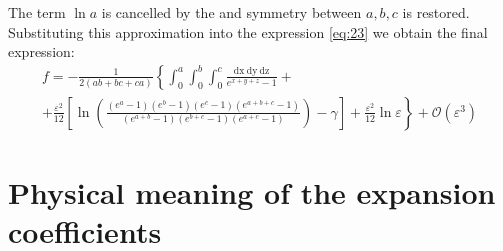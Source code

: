 \documentclass{article}
\newcommand{\dx}{\mathrm{dx}~}
\newcommand{\dy}{\mathrm{dy}~}
\newcommand{\dz}{\mathrm{dz}}
\begin{document}
  

The term $\ln a$ is cancelled by the  and symmetry between $a,b,c$ is restored.
Substituting this approximation into the expression \eqref{eq:23} we obtain 
 the final expression:
\begin{multline}
  \label{eq:3}
 f=-\frac{1}{2(ab+bc+ca)}\left\{\int_{0}^{a} \int_{0}^{b}\int_{0}^{c}\frac{\dx \dy \dz}{e^{x+y+z}-1}+\right.\\
  \left.+\frac{\varepsilon^{2}}{12}\left[\ln\left(\frac{(e^{a}-1)(e^{b}-1)(e^{c}-1)(e^{a+b+c}-1)}{(e^{a+b}-1)(e^{b+c}-1)(e^{a+c}-1)}\right)-
      \gamma\right]+\frac{\varepsilon^{2}}{12}\ln \varepsilon\right\} +\mathcal{O}(\varepsilon^{3})
\end{multline}

\section{Physical meaning of the expansion coefficients}
\label{sec:accur-expans-phys}
\end{document}
